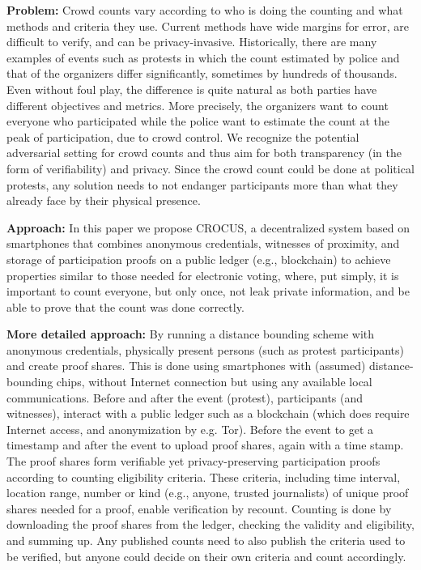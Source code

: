 



\textbf{Problem:}
Crowd counts vary according to who is doing the counting and what
methods and criteria they use. Current methods have wide margins for
error, are difficult to verify, and can be
privacy-invasive. Historically, there are many examples of events such
as protests in which the count estimated by police and that of the
organizers differ significantly, sometimes by hundreds of
thousands. Even without foul play, the difference is quite natural as
both parties have different objectives and metrics. More precisely,
the organizers want to count everyone who participated while the
police want to estimate the count at the peak of participation, due to
crowd control. We
recognize the potential adversarial setting for crowd counts and thus
aim for both transparency (in the form of verifiability) and
privacy. Since the crowd count could be done at political protests,
any solution needs to not endanger participants more than what they
already face by their physical presence.

\textbf{Approach:}
 In this paper we propose CROCUS, a decentralized system based on
 smartphones that combines anonymous credentials, witnesses of
 proximity, and storage of participation proofs on a public ledger
 (e.g., blockchain) to achieve properties similar to those needed for
 electronic voting, where, put simply, it is important to count
 everyone, but only once, not leak private information, and be able to
 prove that the count was done correctly. 


\textbf{More detailed approach:} 
By running a distance bounding scheme with anonymous credentials,
physically present persons (such as protest participants) and create proof
shares. This is done using smartphones with (assumed)
distance-bounding chips, without Internet connection but using any
available local communications. Before and after the event (protest), participants (and
witnesses), interact with a public ledger such as a blockchain (which does require
Internet access, and anonymization by e.g. Tor). Before the event to get
a timestamp and after the event to upload proof shares, again with a
time stamp. The proof shares form verifiable yet privacy-preserving
participation proofs according to counting eligibility criteria. These criteria, including
time interval, location range, number or kind (e.g., anyone, trusted
journalists) of unique proof shares
needed for a proof, enable verification by recount. Counting is done
by downloading the proof shares from the ledger, checking the validity
and eligibility, and summing up. Any published counts need to also
publish the criteria used to be verified, but anyone could decide on
their own criteria and count accordingly. 

